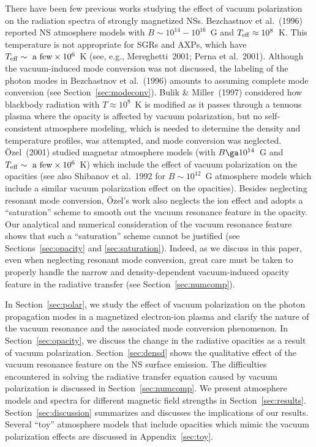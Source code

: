 \documentclass{mn2e}
\newcommand{\etal}{et al.}
\newcommand{\Teff}{T_{\rm eff}}
\begin{document}
There have been few previous works studying the effect of
vacuum polarization on the radiation spectra of strongly magnetized NSs.
Bezchastnov \etal~(1996) reported NS atmosphere models
with $B\sim 10^{14}-10^{16}$~G and $\Teff\approx 10^8$~K.
This temperature is not appropriate for SGRs and AXPs, which have
$\Teff\sim\mbox{ a few}\times 10^6$~K (see, e.g., Mereghetti~2001;
Perna \etal~2001).
Although the vacuum-induced mode conversion was not discussed,
the labeling of the photon modes in
Bezchastnov \etal~(1996) amounts to assuming complete mode conversion
(see Section~\ref{sec:modeconv}).
Bulik \& Miller~(1997) considered how blackbody radiation with
$T\approx 10^8$~K is modified as it passes through a tenuous
plasma where the opacity is affected by vacuum polarization,
but no self-consistent atmosphere modeling, which is needed to
determine the density and temperature profiles, was attempted,
and mode conversion was neglected.
\"{O}zel~(2001) studied magnetar atmosphere models
(with $B\ga 10^{14}$~G and $\Teff\sim\mbox{ a few}\times 10^6$~K)
which include the effect of vacuum polarization on the opacities
(see also Shibanov \etal~1992 for $B\sim 10^{12}$~G
atmosphere models which include a similar vacuum polarization effect
on the opacities).
Besides neglecting resonant mode conversion, \"{O}zel's work
also neglects the ion effect and adopts a ``saturation'' scheme
to smooth out the vacuum resonance feature in the opacity.
Our analytical and numerical
consideration of the vacuum resonance feature shows that such
a ``saturation'' scheme cannot be justified
(see Sections~\ref{sec:opacity} and \ref{sec:saturation}).
Indeed, as we discuss in this paper, even when neglecting resonant
mode conversion, great care must be taken to properly handle
the narrow and density-dependent vacuum-induced opacity feature
in the radiative transfer (see Section~\ref{sec:numcomp}).

In Section~\ref{sec:polar}, we study the effect of vacuum polarization
on the photon propagation modes in a magnetized electron-ion plasma
and clarify the nature of the vacuum resonance and the associated mode
conversion phenomenon.
In Section~\ref{sec:opacity}, we discuss the change in the radiative
opacities as a result of vacuum polarization.
Section~\ref{sec:densd} shows the qualitative effect of the vacuum
resonance feature on the NS surface emission.
The difficulties encountered in solving the radiative
transfer equation caused by vacuum polarization is discussed
in Section~\ref{sec:numcomp}.
We present atmosphere models and spectra for different magnetic
field strengths in Section~\ref{sec:results}.
Section~\ref{sec:discussion} summarizes and discusses the
implications of our results.
Several ``toy'' atmosphere models that include opacities which mimic
the vacuum polarization effects are discussed in Appendix~\ref{sec:toy}.
\end{document}
